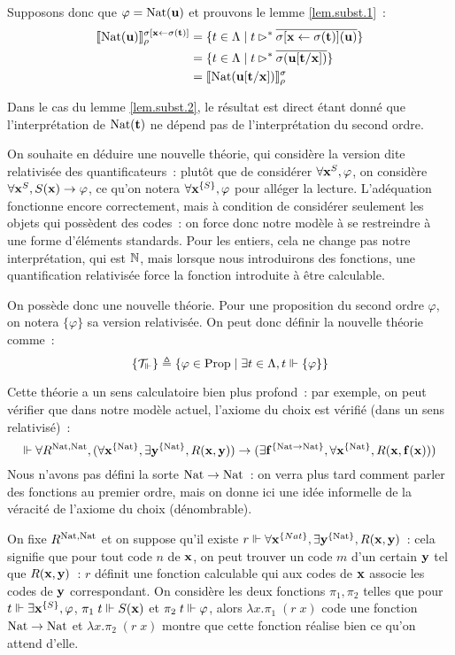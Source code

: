 \documentclass{article}
\begin{document}
Supposons donc que $\varphi = \mathrm{Nat}(\mathbf{u})$ et prouvons le lemme \ref{lem.subst.1}~:
\begin{align*}
    \llbracket \mathrm{Nat}(\mathbf{u}) \rrbracket_\rho^{\sigma[\mathbf{x}\leftarrow \sigma(\mathbf{t})]} &= \{t \in \Lambda\mid t \rhd^* \overline{\sigma[\mathbf{x}\leftarrow\sigma(\mathbf{t})](\mathbf{u})}\}\\
    &= \{ t \in \Lambda\mid t \rhd^* \overline{\sigma(\mathbf{u}[\mathbf{t}/\mathbf{x}])}\}\\
    &= \llbracket \mathrm{Nat}(\mathbf{u}[\mathbf{t}/\mathbf{x}]) \rrbracket_\rho^\sigma
\end{align*}

Dans le cas du lemme \ref{lem.subst.2}, le résultat est direct étant donné que l'interprétation de $\mathrm{Nat}(\mathbf{t})$ ne dépend pas de l'interprétation du second ordre.

On souhaite en déduire une nouvelle théorie, qui considère la version dite relativisée des quantificateurs~: plutôt que de considérer $\forall \mathbf{x}^S, \varphi$, on considère $\forall \mathbf{x}^S, S(\mathbf{x}) \to \varphi$, ce qu'on notera $\forall \mathbf{x}^{\{S\}}, \varphi$ pour alléger la lecture. L'adéquation fonctionne encore correctement, mais à condition de considérer seulement les objets qui possèdent des codes~: on force donc notre modèle à se restreindre à une forme d'éléments standards. Pour les entiers, cela ne change pas notre interprétation, qui est $\mathbb{N}$, mais lorsque nous introduirons des fonctions, une quantification relativisée force la fonction introduite à être calculable.

On possède donc une nouvelle théorie. Pour une proposition du second ordre $\varphi$, on notera $\{\varphi\}$ sa version relativisée. On peut donc définir la nouvelle théorie comme~:
\[\{\mathcal T_\Vdash\} \triangleq \{\varphi \in \mathrm{Prop}\mid \exists t \in \Lambda, t \Vdash\{\varphi\}\}\]

Cette théorie a un sens calculatoire bien plus profond~: par exemple, on peut vérifier que dans notre modèle actuel, l'axiome du choix est vérifié (dans un sens relativisé)~:
\[\Vdash \forall R^{\mathrm{Nat},\mathrm{Nat}},(\forall \mathbf{x}^{\{\mathrm{Nat}\}}, \exists \mathbf{y}^{\{\mathrm{Nat}\}}, R(\mathbf{x},\mathbf{y}))\to (\exists \mathbf{f}^{\{\mathrm{Nat}\to\mathrm{Nat}\}}, \forall \mathbf{x}^{\{\mathrm{Nat}\}}, R(\mathbf{x},\mathbf{f}(\mathbf{x})))\]
Nous n'avons pas défini la sorte $\mathrm{Nat}\to\mathrm{Nat}$~: on verra plus tard comment parler des fonctions au premier ordre, mais on donne ici une idée informelle de la véracité de l'axiome du choix (dénombrable).

On fixe $R^{\mathrm{Nat},\mathrm{Nat}}$ et on suppose qu'il existe $r\Vdash \forall \mathbf{x}^{\{Nat\}}, \exists \mathbf{y}^{\{\mathrm{Nat}\}}, R(\mathbf{x},\mathbf{y})$~: cela signifie que pour tout code $n$ de $\mathbf{x}$, on peut trouver un code $m$ d'un certain $\mathbf{y}$ tel que $R(\mathbf{x},\mathbf{y})$~: $r$ définit une fonction calculable qui aux codes de $\mathbf{x}$ associe les codes de $\mathbf{y}$ correspondant. On considère les deux fonctions $\pi_1,\pi_2$ telles que pour $t \Vdash \exists \mathbf{x}^{\{S\}}, \varphi$, $\pi_1\;t\Vdash S(\mathbf{x})$ et $\pi_2\;t\Vdash \varphi$, alors $\lambda x.\pi_1\;(r\;x)$ code une fonction $\mathrm{Nat}\to\mathrm{Nat}$ et $\lambda x.\pi_2\;(r\;x)$ montre que cette fonction réalise bien ce qu'on attend d'elle.
\end{document}
